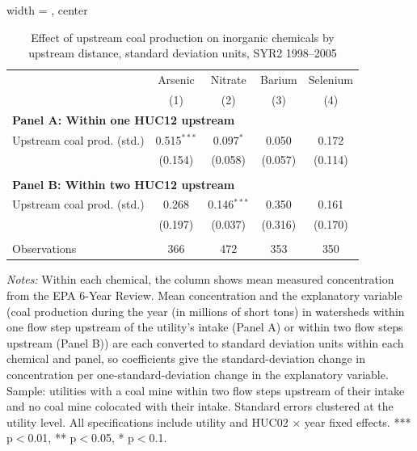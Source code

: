 \begin{table}[htbp]
   
   \caption{\label{tab:6yr_huc02fe_inorg_ravalli_2005_k2_sd_prod} Effect of upstream coal production on inorganic chemicals by upstream distance, standard deviation units, SYR2 1998--2005}
   \bigskip
   
   \centering
   
\begin{adjustbox}{width = \textwidth, center}
   \begin{tabular}{lcccc}
      \toprule
       & Arsenic & Nitrate & Barium & Selenium \\
                                 & (1)           & (2)         & (3)     & (4)\\  
      \midrule 
      \multicolumn{5}{l}{\textbf{Panel A: Within one HUC12 upstream}} \\
      Upstream coal prod. (std.) & 0.515$^{***}$ & 0.097$^{*}$ & 0.050   & 0.172\\   
                                 & (0.154)       & (0.058)     & (0.057) & (0.114)\\   
       \\
      \midrule 
      \multicolumn{5}{l}{\textbf{Panel B: Within two HUC12 upstream}} \\
      Upstream coal prod. (std.) & 0.268   & 0.146$^{***}$ & 0.350   & 0.161\\   
                                 & (0.197) & (0.037)       & (0.316) & (0.170)\\   
       \\
      Observations               & 366     & 472           & 353     & 350\\  
      \bottomrule
   \end{tabular}
\end{adjustbox}
   
   {\tiny\linespread{1}\selectfont \par \raggedright 
   \textit{Notes:} Within each chemical, the column shows mean measured concentration from the EPA 6-Year Review. Mean concentration and the explanatory variable (coal production during the year (in millions of short tons) in watersheds within one flow step upstream of the utility's intake (Panel A) or within two flow steps upstream (Panel B)) are each converted to standard deviation units within each chemical and panel, so coefficients give the standard-deviation change in concentration per one-standard-deviation change in the explanatory variable. Sample: utilities with a coal mine within two flow steps upstream of their intake and no coal mine colocated with their intake. Standard errors clustered at the utility level. All specifications include utility and HUC02 $\times$ year fixed effects. *** p$<$0.01, ** p$<$0.05, * p$<$0.1.}
   
\end{table}



